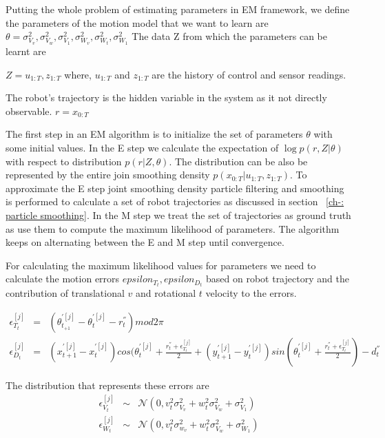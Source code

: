 \documentclass[12pt,draft]{dalcsthesis}
\begin{document}
Putting the whole problem of estimating parameters in EM framework, we define the parameters of the motion model that we want to learn are
$\theta={\sigma_{V_{v}}^{2},\sigma_{V_{w}}^{2},\sigma_{V_{1}}^{2},\sigma_{W_{v}}^{2},\sigma_{W_{t}}^{2},\sigma_{W_{1}}^{2}}$
The data Z from which the parameters can be learnt are
 
$Z={u_{1:T},z_{1:T}}$
where,
$u_{1:T}$ and $z_{1:T}$ are the history of control and sensor readings.

The robot's trajectory is the hidden variable in the system as it not directly observable. 
$r=x_{0:T}$

The first step in an EM algorithm is to initialize the set of parameters $\theta$ with some initial values. In the E step we calculate the expectation of $\log p(r,Z|\theta)$ with respect to distribution $p(r|Z,\theta)$. The distribution can be also be represented by the entire join smoothing density $p(x_{0:T}|u_{1:T},z_{1:T})$. To approximate the E step joint smoothing density particle filtering and smoothing is performed to calculate a set of robot trajectories as discussed in section ~\ref{ch-: particle smoothing}. In the M step we treat the set of trajectories as ground truth as use them to compute the maximum likelihood of parameters. The algorithm keeps on alternating between the E and M step until convergence. 

For calculating the maximum likelihood values for parameters we need to calculate the motion errors $epsilon_{T_{t}},epsilon_{D_{t}}$ based on robot trajectory and the contribution of translational $v$ and rotational $t$ velocity to the errors.

\begin{eqnarray}
\epsilon_{T_{t}}^{[j]}&=&(\theta_{t_{+1}}^{'[j]}-\theta_{t}^{'[j]}-r_{t}^{''})mod2\pi\\
\epsilon_{D_{t}}^{[j]}&=&(x_{t+1}^{'[j]}-x_{t}^{'[j]})cos(\theta_{t}^{'[j]}+\frac{r_{t}^{''}+\epsilon_{T_{t}}^{[j]}}{2}+(y_{t+1}^{'[j]}-y_{t}^{'[j]})sin(\theta_{t}^{'[j]}+\frac{r_{t}^{''}+\epsilon_{T_{t}}^{[j]}}{2})-d_{t}^{''}
\end{eqnarray}

The distribution that represents these errors are 
\begin{eqnarray}
\epsilon_{V_{t}}^{[j]}&\sim&\mathcal{{N}}(0,v_{t}^{2}\sigma_{V_{v}}^{2}+w_{t}^{2}\sigma_{V_{w}}^{2}+\sigma_{V_{1}}^{2})\\
\epsilon_{W_{t}}^{[j]}&\sim&\mathcal{{N}}(0,v_{t}^{2}\sigma_{w_{v}}^{2}+w_{t}^{2}\sigma_{V_{w}}^{2}+\sigma_{W_{1}}^{2})
\end{eqnarray}
\end{document}
